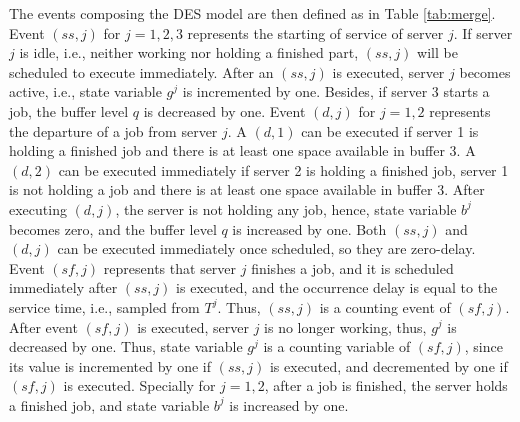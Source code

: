 \documentclass[suppldata]{interact}
\theoremstyle{plain}
\theoremstyle{definition}
\theoremstyle{remark}
\begin{document}
The events composing the DES model are then defined as in Table \ref{tab:merge}. Event ${(ss,j)}$ for $j=1,2,3$ represents the starting of service of server $j$. If server $j$ is idle, i.e., neither working nor holding a finished part, ${(ss,j)}$ will be scheduled to execute immediately. After an ${(ss,j)}$ is executed, server $j$ becomes active, i.e., state variable $g^j$ is incremented by one. Besides, if server 3 starts a job, the buffer level $q$ is decreased by one. Event ${(d,j)}$ for $j=1,2$ represents the departure of a job from server $j$. A ${(d,1)}$ can be executed if server 1 is holding a finished job and there is at least one space available in buffer 3. A ${(d,2)}$ can be executed immediately if server 2 is holding a finished job, server 1 is not holding a job and there is at least one space available in buffer 3. After executing ${(d,j)}$, the server is not holding any job, hence, state variable $b^{j}$ becomes zero, and the buffer level $q$ is increased by one. Both ${(ss,j)}$ and ${(d,j)}$ can be executed immediately once scheduled, so they are zero-delay. Event ${(sf,j)}$ represents that server $j$ finishes a job, and it is scheduled immediately after ${(ss,j)}$ is executed, and the occurrence delay is equal to the service time, i.e., sampled from $T^{j}$. Thus, ${(ss,j)}$ is a counting event of ${(sf,j)}$. After event ${(sf,j)}$ is executed, server $j$ is no longer working, thus, $g^j$ is decreased by one. Thus, state variable $g^j$ is a counting variable of ${(sf,j)}$, since its value is incremented by one if ${(ss,j)}$ is executed, and decremented by one if  ${(sf,j)}$ is executed. Specially for $j=1,2$, after a job is finished, the server holds a finished job, and state variable $b^j$ is increased by one. %
\end{document}
